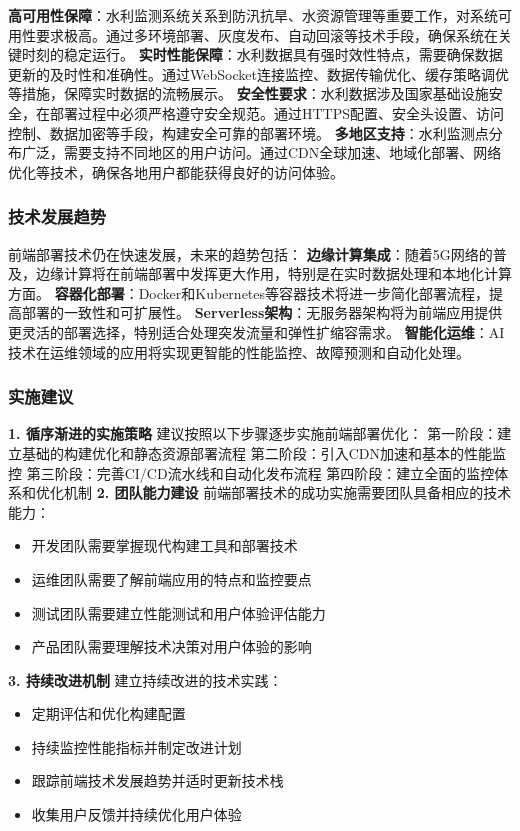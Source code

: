 \textbf{高可用性保障}：水利监测系统关系到防汛抗旱、水资源管理等重要工作，对系统可用性要求极高。通过多环境部署、灰度发布、自动回滚等技术手段，确保系统在关键时刻的稳定运行。 \textbf{实时性能保障}：水利数据具有强时效性特点，需要确保数据更新的及时性和准确性。通过WebSocket连接监控、数据传输优化、缓存策略调优等措施，保障实时数据的流畅展示。 \textbf{安全性要求}：水利数据涉及国家基础设施安全，在部署过程中必须严格遵守安全规范。通过HTTPS配置、安全头设置、访问控制、数据加密等手段，构建安全可靠的部署环境。 \textbf{多地区支持}：水利监测点分布广泛，需要支持不同地区的用户访问。通过CDN全球加速、地域化部署、网络优化等技术，确保各地用户都能获得良好的访问体验。 \subsubsection{技术发展趋势}\label{ux6280ux672fux53d1ux5c55ux8d8bux52bf} 前端部署技术仍在快速发展，未来的趋势包括： \textbf{边缘计算集成}：随着5G网络的普及，边缘计算将在前端部署中发挥更大作用，特别是在实时数据处理和本地化计算方面。 \textbf{容器化部署}：Docker和Kubernetes等容器技术将进一步简化部署流程，提高部署的一致性和可扩展性。 \textbf{Serverless架构}：无服务器架构将为前端应用提供更灵活的部署选择，特别适合处理突发流量和弹性扩缩容需求。 \textbf{智能化运维}：AI技术在运维领域的应用将实现更智能的性能监控、故障预测和自动化处理。 \subsubsection{实施建议}\label{ux5b9eux65bdux5efaux8bae} \textbf{1. 循序渐进的实施策略} 建议按照以下步骤逐步实施前端部署优化： 第一阶段：建立基础的构建优化和静态资源部署流程 第二阶段：引入CDN加速和基本的性能监控 第三阶段：完善CI/CD流水线和自动化发布流程 第四阶段：建立全面的监控体系和优化机制 \textbf{2. 团队能力建设} 前端部署技术的成功实施需要团队具备相应的技术能力： \begin{itemize} \item 开发团队需要掌握现代构建工具和部署技术 \item 运维团队需要了解前端应用的特点和监控要点 \item 测试团队需要建立性能测试和用户体验评估能力 \item 产品团队需要理解技术决策对用户体验的影响 \end{itemize} \textbf{3. 持续改进机制} 建立持续改进的技术实践： \begin{itemize} \item 定期评估和优化构建配置 \item 持续监控性能指标并制定改进计划 \item 跟踪前端技术发展趋势并适时更新技术栈 \item 收集用户反馈并持续优化用户体验 \end{itemize} 
